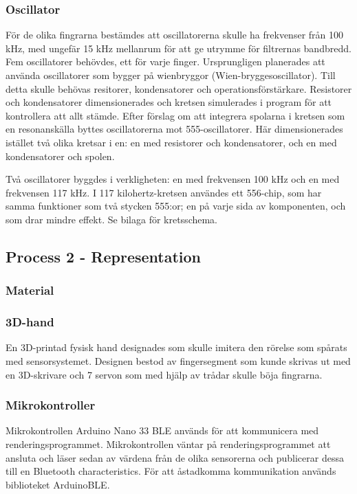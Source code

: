 \documentclass[a4paper]{article}
\begin{document}
\begin{sloppypar}
    \subsubsection{Oscillator}
    För de olika fingrarna bestämdes att oscillatorerna skulle ha frekvenser från 100 kHz, med ungefär 15 kHz mellanrum för att ge utrymme för filtrernas bandbredd. Fem oscillatorer behövdes, ett för varje finger.
    Ursprungligen planerades att använda oscillatorer som bygger på wienbryggor (Wien-bryggesoscillator).
    Till detta skulle behövas resitorer, kondensatorer och operationsförstärkare. Resistorer och kondensatorer dimensionerades och kretsen simulerades i program för att kontrollera att allt stämde.
    Efter förslag om att integrera spolarna i kretsen som en resonanskälla byttes oscillatorerna mot 555-oscillatorer.
    Här dimensionerades istället två olika kretsar i en: en med resistorer och kondensatorer, och en med kondensatorer och spolen.

    Två oscillatorer byggdes i verkligheten: en med frekvensen 100 kHz och en med frekvensen 117 kHz.
    I 117 kilohertz-kretsen användes ett 556-chip, som har samma funktioner som två stycken 555:or; en på varje sida av komponenten, och som drar mindre effekt. Se bilaga för kretsschema.

    
    \subsection{Process 2 - Representation}

    \subsubsection{Material}
    
    \subsubsection{3D-hand}
    En 3D-printad fysisk hand designades som skulle imitera den rörelse som spårats med sensorsystemet.
    Designen bestod av fingersegment som kunde skrivas ut med en 3D-skrivare och 7 servon som med hjälp av trådar skulle böja fingrarna.

    \subsubsection{Mikrokontroller}
    Mikrokontrollen Arduino Nano 33 BLE används för att kommunicera med renderingsprogrammet.
    Mikrokontrollen väntar på renderingsprogrammet att ansluta och
    läser sedan av värdena från de olika sensorerna och publicerar dessa till en Bluetooth characteristics.
    För att åstadkomma kommunikation används biblioteket ArduinoBLE.


\end{sloppypar}
\end{document}
